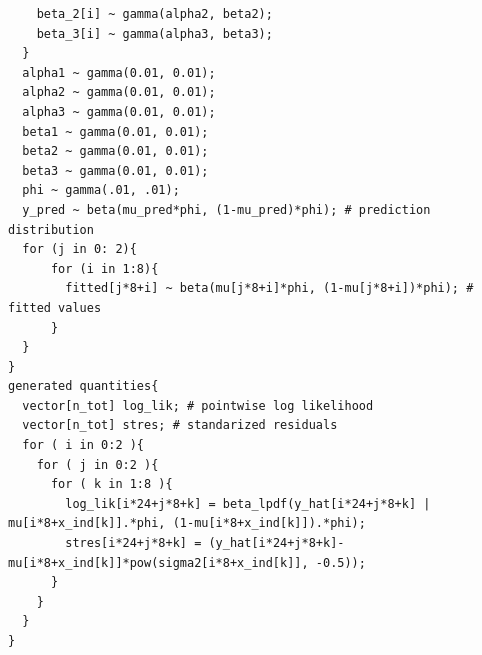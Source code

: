 \documentclass{article}
\begin{document}
\begin{lstlisting}
    beta_2[i] ~ gamma(alpha2, beta2);
    beta_3[i] ~ gamma(alpha3, beta3);
  }
  alpha1 ~ gamma(0.01, 0.01); 
  alpha2 ~ gamma(0.01, 0.01);
  alpha3 ~ gamma(0.01, 0.01);
  beta1 ~ gamma(0.01, 0.01);
  beta2 ~ gamma(0.01, 0.01);
  beta3 ~ gamma(0.01, 0.01);
  phi ~ gamma(.01, .01);
  y_pred ~ beta(mu_pred*phi, (1-mu_pred)*phi); # prediction distribution
  for (j in 0: 2){
      for (i in 1:8){
        fitted[j*8+i] ~ beta(mu[j*8+i]*phi, (1-mu[j*8+i])*phi); # fitted values
      }
  }
}
generated quantities{
  vector[n_tot] log_lik; # pointwise log likelihood 
  vector[n_tot] stres; # standarized residuals
  for ( i in 0:2 ){
    for ( j in 0:2 ){
      for ( k in 1:8 ){
        log_lik[i*24+j*8+k] = beta_lpdf(y_hat[i*24+j*8+k] | mu[i*8+x_ind[k]].*phi, (1-mu[i*8+x_ind[k]]).*phi);
        stres[i*24+j*8+k] = (y_hat[i*24+j*8+k]-mu[i*8+x_ind[k]]*pow(sigma2[i*8+x_ind[k]], -0.5));
      }
    }
  }
}
\end{lstlisting}
\end{document}

